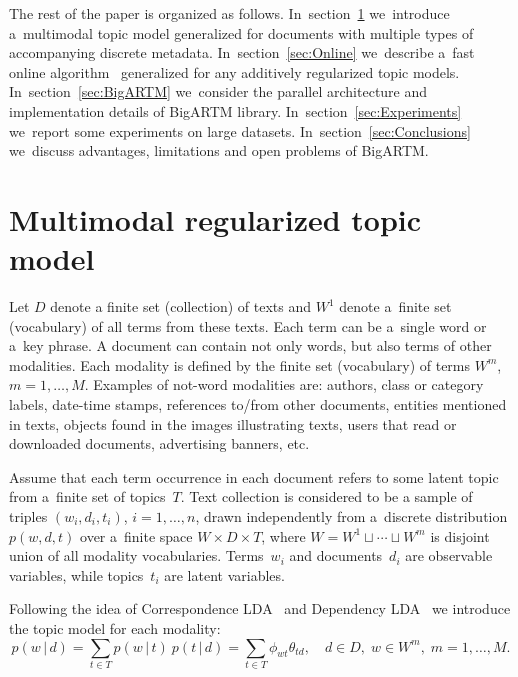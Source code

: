 \documentclass[russian]{llncs}
\newcommand{\cond}{\mspace{3mu}{|}\mspace{3mu}}
\begin{document}
The rest of the paper is organized as follows.
In~section~\ref{sec:Multimodal}
we~introduce a~multimodal topic model generalized for documents with multiple types of accompanying discrete metadata.
In~section~\ref{sec:Online}
we~describe a~fast online algorithm~\cite{hoffman10online} generalized for any additively regularized topic models.
In~section~\ref{sec:BigARTM}
we~consider the parallel architecture and implementation details of BigARTM library.
In~section~\ref{sec:Experiments}
we~report some experiments on large datasets.
In~section~\ref{sec:Conclusions}
we~discuss advantages, limitations and open problems of BigARTM.

\section{Multimodal regularized topic model}
\label{sec:Multimodal}


Let
$D$ denote a finite set (collection) of texts and
$W^1$ denote a~finite set (vocabulary) of all terms from these texts.
Each term can be a~single word or a~key phrase.
A document can contain not only words, but also terms of other modalities.
Each modality is defined by the finite set (vocabulary) of terms $W^m$, ${m=1,\dots,M}$.
Examples of not-word modalities are:
authors,
class or category labels,
date-time stamps,
references to/from other documents,
entities mentioned in texts,
objects found in the images illustrating texts,
users that read or downloaded documents,
advertising banners,
etc.

Assume that
each term occurrence in each document refers to some latent topic from a~finite set of topics~$T$.
Text collection is considered to be a sample of triples
$(w_i,d_i,t_i)$,\; ${i=1,\dots,n}$,
drawn independently from a~discrete distribution $p(w,d,t)$ over a~finite space $W\times D \times T$,
where ${W=W^1\sqcup\cdots\sqcup W^m}$ is disjoint union of all modality vocabularies.
Terms~$w_i$ and documents~$d_i$ are observable variables,
while topics~$t_i$ are latent variables.

Following the idea of Correspondence LDA~\cite{blei03modeling}
and Dependency LDA~\cite{rubin12statistical}
we introduce the topic model for each modality:
\[
    p(w\cond d)
    = \sum_{t\in T} p(w\cond t)\: p(t\cond d)
    = \sum_{t\in T} \phi_{wt} \theta_{td},
    \quad
    d\in D,\; w\in W^m,\; m=1,\dots,M.
\]
\end{document}
